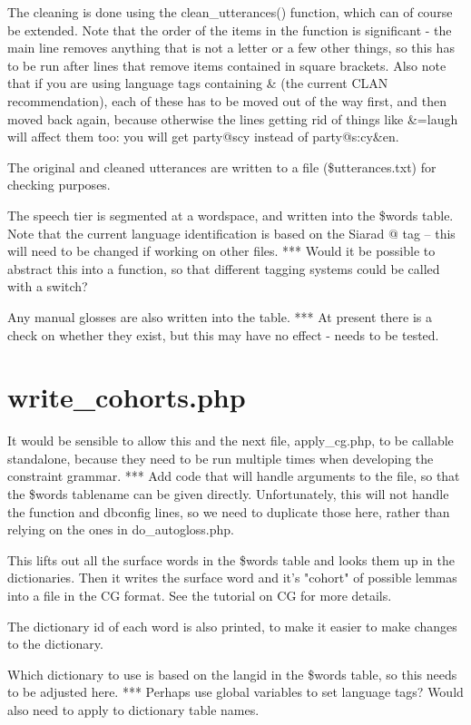 \documentclass[a4paper,10pt]{article}
\begin{document}
{The cleaning is done using the clean\_utterances() function, which can of course be extended.  Note that the order of the items in the function is significant - the main line removes anything that is not a letter or a few other things, so this has to be run after lines that remove items contained in square brackets.  Also note that if you are using language tags containing \& (the current CLAN recommendation), each of these has to be moved out of the way first, and then moved back again, because otherwise the lines getting rid of things like \&=laugh will affect them too: you will get party@scy instead of party@s:cy\&en.

The original and cleaned utterances are written to a file (\$utterances.txt) for checking purposes.

The speech tier is segmented at a wordspace, and written into the \$words table.  Note that the current language identification is based on the Siarad @ tag -- this will need to be changed if working on other files.
*** Would it be possible to abstract this into a function, so that different tagging systems could be called with a switch?

Any manual glosses are also written into the table.
*** At present there is a check on whether they exist, but this may have no effect - needs to be tested.


\section{write\_cohorts.php}
\label{sec:cohorts}

It would be sensible to allow this and the next file, apply\_cg.php, to be callable standalone, because they need to be run multiple times when developing the constraint grammar.
*** Add code that will handle arguments to the file, so that the \$words tablename can be given directly.  Unfortunately, this will not handle the function and dbconfig lines, so we need to duplicate those here, rather than relying on the ones in do\_autogloss.php.

This lifts out all the surface words in the \$words table and looks them up in the dictionaries.  Then it writes the surface word and it's "cohort" of possible lemmas into a file in the CG format.  See the tutorial on CG for more details.

The dictionary id of each word is also printed, to make it easier to make changes to the dictionary.

Which dictionary to use is based on the langid in the \$words table, so this needs to be adjusted here.
*** Perhaps use global variables to set language tags?  Would also need to apply to dictionary table names.

}
\end{document}
